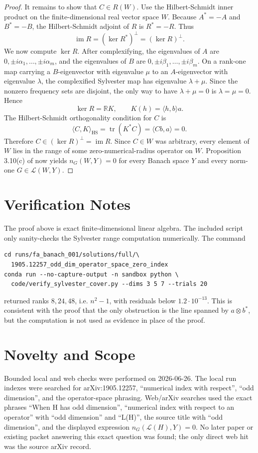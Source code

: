 \documentclass[11pt]{article}
\newcommand{\R}{\mathbb{R}}
\newcommand{\cL}{\mathcal{L}}
\newcommand{\tr}{\operatorname{tr}}
\newcommand{\im}{\operatorname{im}}
\newcommand{\kerop}{\operatorname{ker}}
\begin{document}
\begin{proof}
It remains to show that $C\in R(W)$.  Use the Hilbert-Schmidt inner product
on the finite-dimensional real vector space $W$.  Because $A^*=-A$ and
$B^*=-B$, the Hilbert-Schmidt adjoint of $R$ is $R^*=-R$.  Thus
\[
  \im R=(\kerop R^*)^\perp=(\kerop R)^\perp .
\]
We now compute $\kerop R$.  After complexifying, the eigenvalues of $A$ are
$0,\pm i\alpha_1,\ldots,\pm i\alpha_m$, and the eigenvalues of $B$ are
$0,\pm i\beta_1,\ldots,\pm i\beta_m$.  On a rank-one map carrying a
$B$-eigenvector with eigenvalue $\mu$ to an $A$-eigenvector with eigenvalue
$\lambda$, the complexified Sylvester map has eigenvalue $\lambda+\mu$.
Since the nonzero frequency sets are disjoint, the only way to have
$\lambda+\mu=0$ is $\lambda=\mu=0$.  Hence
\[
  \kerop R=\R K,\qquad K(h)=\langle h,b\rangle a.
\]
The Hilbert-Schmidt orthogonality condition for $C$ is
\[
  \langle C,K\rangle_{\mathrm{HS}}=\tr(K^*C)=\langle Cb,a\rangle=0.
\]
Therefore $C\in(\kerop R)^\perp=\im R$.  Since $C\in W$ was arbitrary, every
element of $W$ lies in the range of some zero-numerical-radius operator on
$W$.  Proposition 3.10(c) of \cite{KMMPQ} now yields
$n_G(W,Y)=0$ for every Banach space $Y$ and every norm-one
$G\in\cL(W,Y)$.
\end{proof}

\section*{Verification Notes}

The proof above is exact finite-dimensional linear algebra.  The included
script  only sanity-checks the
Sylvester range computation numerically.  The command
\begin{verbatim}
cd runs/fa_banach_001/solutions/full/\
  1905.12257_odd_dim_operator_space_zero_index
conda run --no-capture-output -n sandbox python \
  code/verify_sylvester_cover.py --dims 3 5 7 --trials 20
\end{verbatim}
returned ranks $8,24,48$, i.e. $n^2-1$, with residuals below $1.2\cdot 10^{-13}$.
This is consistent with the proof that the only obstruction is the line
spanned by $a\otimes b^*$, but the computation is not used as evidence in
place of the proof.

\section*{Novelty and Scope}

Bounded local and web checks were performed on 2026-06-26.  The local run
indexes were searched for arXiv:1905.12257, ``numerical index with respect'',
``odd dimension'', and the operator-space phrasing.  Web/arXiv searches used
the exact phrases ``When H has odd dimension'', ``numerical index with respect
to an operator'' with ``odd dimension'' and ``L(H)'', the source title with
``odd dimension'', and the displayed expression
$n_G(\mathcal L(H),Y)=0$.  No later paper or existing packet answering this
exact question was found; the only direct web hit was the source arXiv record.
\end{document}

